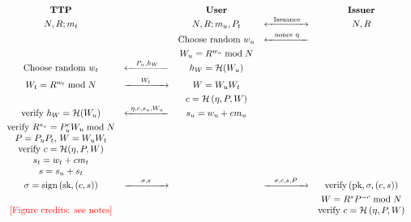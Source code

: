 \begin{frame}[plain]
  \vspace{-0.3cm}
    \begin{figure}
    \[
    \begin{array}{c c c c c}
    \textbf{TTP} & & \textbf{User} & & \textbf{Issuer}\\
    N, R; m_t & & N, R; m_u, P_t & \XLR{\text{Issuance}} & N, R \\
     & & \text{Choose random } w_u & \XL{\text{nonce }\eta} & \\
     & & W_u = R^{w_u} \bmod N & & \\
     \text{Choose random } w_t & \XL{P_u, h_W} & h_W = \mathcal{H}(W_u) & & \\
    W_t = R^{w_t} \bmod N & \XR{W_t} & W = W_uW_t & & \\
     & & c = \mathcal{H}\left(\eta, P, W\right) & & \\
    \text{verify } h_W = \mathcal{H}(W_u) & \XL{\eta, c, s_u, W_u} & s_u = w_u + cm_u & & \\
    \text{verify }R^{s_u} = P_u^cW_u \bmod N & & & & \\
    P = P_uP_t,\, W = W_uW_t & & & & \\
    \text{verify }c = \mathcal{H}(\eta, P, W) & & & & \\
    s_t = w_t + cm_t & & & & \\
    s = s_u + s_t & & & & \\
    \sigma = \text{sign}\left(\text{sk}, \left(c,s\right)\right) & \XR{\sigma, s} & & \XR{\sigma, c, s, P} &  \text{verify}\left(\text{pk}, \sigma, \left(c,s\right)\right)\\
     & & & & W = R^sP^{-c} \bmod N \\
     \text{\color{red}{[Figure credits: see notes]}}& & & & \text{verify }c = \mathcal{H}\left(\eta, P, W\right)
    \end{array}
    \]
    \end{figure}
\end{frame}

